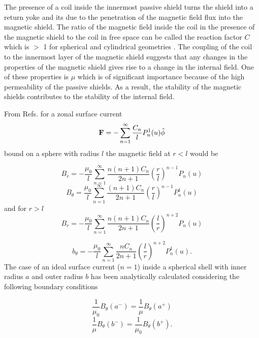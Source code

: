 \documentclass[review]{elsarticle}
\begin{document}
The presence of a coil inside the innermost passive shield turns the shield into a return yoke and its due to the penetration of the magnetic field flux into the magnetic shield. The ratio of the magnetic field inside the coil in the presence of the magnetic shield to the coil in free space can be called the reaction factor $C$ which is $>$ 1 for spherical and cylindrical geometries \cite{bib:bidinosti}. The coupling of the coil to the innermost layer of the magnetic shield suggests that any changes in the properties of the magnetic shield gives rise to a change in the internal field. One of these properties is $\mu$ which is of significant importance because of the high permeability of the passive shields. As a result, the stability of the magnetic shields contributes to the stability of the internal field.

From Refs. \cite{bib:smythe, bib:ferraro} for a zonal surface current
\begin{equation}
\bold{F}=- \sum_{n=1} ^{\infty} \frac{C_n}{l} P^1 _n (u) \hat{\phi}
\end{equation}
bound on a sphere with radius $l$ the magnetic field at $r < l$ would be

\begin{equation}
B_r = - \frac{\mu_0 }{l} \sum _{n=1} ^{\infty} \frac{n(n+1)C_n}{2n+1} \left( \frac{r}{l}\right)^{n-1} P_n(u)
\end{equation}
\begin{equation}
B_{\theta} =\frac{\mu_0 }{l} \sum _{n=1} ^{\infty} \frac{(n+1)C_n}{2n+1}\left( \frac{r}{l}\right)^{n-1} P_n^1 (u)
\end{equation}
and for $r>l$
\begin{equation}
B_r=-\frac{\mu _0}{l} \sum _{n=1} ^{\infty} \frac{n(n+1)C_n}{2n+1} \left( \frac{l}{r} \right)^{n+2} P_n (u)
\end{equation}

\begin{equation}
b_{\theta}=-\frac{\mu _0}{l}\sum _{n=1} ^{\infty}\frac{n C_n}{2n+1} \left( \frac{l}{r} \right)^{n+2} P_n ^1 (u).
\end{equation}
The case of an ideal surface current ($n=1$) inside a spherical shell with inner radius $a$ and outer radius $b$ has been analytically calculated considering the following boundary conditions

\begin{equation}
\frac{1}{\mu_0} B_{\theta} (a^-) = \frac{1}{\mu} B_{\theta}(a^+)
\end{equation}
\begin{equation}
\frac{1}{\mu}B_{\theta}(b^-)=\frac{1}{\mu_0}B_{\theta}(b^+).
\end{equation}
\end{document}
